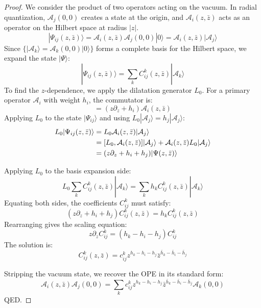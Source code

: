 \begin{tcolorbox}[breakable]
\begin{proof} 
We consider the product of two operators acting on the vacuum. In radial quantization, $\mathcal{A}_j(0,0)$ creates a state at the origin, and $\mathcal{A}_i(z,\bar{z})$ acts as an operator on the Hilbert space at radius $|z|$.
\begin{equation}
	|\Psi_{ij}(z,\bar{z})\rangle = \mathcal{A}_i(z,\bar{z}) \mathcal{A}_j(0,0) |0\rangle = \mathcal{A}_i(z,\bar{z}) |\mathcal{A}_j\rangle
\end{equation}
Since $\{|\mathcal{A}_k\rangle = \mathcal{A}_k(0,0)|0\rangle\}$ forms a complete basis for the Hilbert space, we expand the state $|\Psi\rangle$:
\begin{equation}
	|\Psi_{ij}(z,\bar{z})\rangle = \sum_k C_{ij}^k(z,\bar{z}) |\mathcal{A}_k\rangle
\end{equation}
To find the $z$-dependence, we apply the dilatation generator $L_0$. For a primary operator $\mathcal{A}_i$ with weight $h_i$, the commutator is:
\begin{equation}
	[L_0, \mathcal{A}_i(z,\bar{z})] = (z \partial_z + h_i) \mathcal{A}_i(z,\bar{z})
\end{equation}
Applying $L_0$ to the state $|\Psi_{ij}\rangle$ and using $L_0 |\mathcal{A}_j\rangle = h_j |\mathcal{A}_j\rangle$:
\begin{align}
	L_0 |\Psi_{ij}(z,\bar{z})\rangle &= L_0 \mathcal{A}_i(z,\bar{z}) |\mathcal{A}_j\rangle \notag\\
	&= [L_0, \mathcal{A}_i(z,\bar{z})] |\mathcal{A}_j\rangle + \mathcal{A}_i(z,\bar{z}) L_0 |\mathcal{A}_j\rangle\notag \\
	&= (z \partial_z + h_i + h_j) |\Psi(z,\bar{z})\rangle
\end{align}

Applying $L_0$ to the basis expansion side:
\begin{equation}
	L_0 \sum_k C_{ij}^k(z,\bar{z}) |\mathcal{A}_k\rangle = \sum_k h_k C_{ij}^k(z,\bar{z}) |\mathcal{A}_k\rangle
\end{equation}
Equating both sides, the coefficients $C_{ij}^k$ must satisfy:
\begin{equation}
	(z \partial_z + h_i + h_j) C_{ij}^k(z,\bar{z}) = h_k C_{ij}^k(z,\bar{z})
\end{equation}
Rearranging gives the scaling equation:
\begin{equation}
	z \partial_z C_{ij}^k = (h_k - h_i - h_j) C_{ij}^k
\end{equation}
The solution is:
\begin{equation}
	C_{ij}^k(z,\bar{z}) = c_{ij}^k z^{h_k - h_i - h_j} \bar{z}^{\bar{h}_k - \bar{h}_i - \bar{h}_j}
\end{equation}

Stripping the vacuum state, we recover the OPE in its standard form:
\begin{equation}
	\mathcal{A}_i(z,\bar{z}) \mathcal{A}_j(0,0) = \sum_k c_{ij}^k z^{h_k - h_i - h_j} \bar{z}^{\bar{h}_k - \bar{h}_i - \bar{h}_j} \mathcal{A}_k(0,0)
\end{equation}
	QED.
\end{proof}
\end{tcolorbox} 

